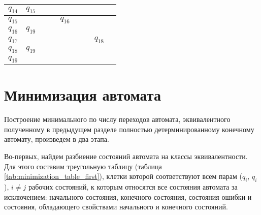 \documentclass[a4paper,14pt,russian]{extarticle} %
\begin{document}
\begin{table}[H]
\begin{threeparttable}
\begin{tabular}{| l | c |c |c |c |c |c |c |c |}
			\({q_{14}}\) & \({q_{15}}\) & \(\) & \(\) & \(\) & \(\) & \(\) & \(\) & \(\) \\ \hline
			\({q_{15}}\) & \(\) & \(\) & \(\) & \({q_{16}}\) & \(\) & \(\) & \(\) & \(\) \\ \hline
			\({q_{16}}\) & \({q_{19}}\) & \(\) & \(\) & \(\) & \(\) & \(\) & \(\) & \(\) \\ \hline
			\({q_{17}}\) & \(\) & \(\) & \(\) & \(\) & \(\) & \(\) & \({q_{18}}\) & \(\) \\ \hline
			\({q_{18}}\) & \({q_{19}}\) & \(\) & \(\) & \(\) & \(\) & \(\) & \(\) & \(\) \\ \hline
			\({q_{19}}\) & \(\) & \(\) & \(\) & \(\) & \(\) & \(\) & \(\) & \(\) \\ \hline
		\end{tabular}			
	\end{threeparttable}
\end{table}	

\section {Минимизация автомата}
Построение минимального по числу переходов автомата, эквивалентного полученному в предыдущем разделе полностью детерминированному конечному автомату, произведем в два этапа.

Во-первых, найдем разбиение состояний автомата на классы эквивалентности. Для этого составим треугольную таблицу (таблица \ref{tab:minimization_table_first}), клетки которой соответствуют всем парам (\(q_i\), \(q_i\)), \(i \neq j\) рабочих состояний, к которым относятся все состояния автомата за исключением: начального состояния, конечного состояния, состояния ошибки и состояния, обладающего свойствами начального и конечного состояний. 
\end{document}
